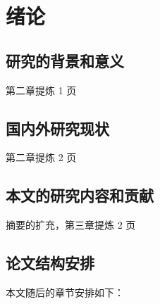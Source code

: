 \chapter{绪论}

\section{研究的背景和意义}

第二章提炼 1 页

\section{国内外研究现状}

第二章提炼 2 页

\section{本文的研究内容和贡献}

摘要的扩充，第三章提炼 2 页

\section{论文结构安排}

本文随后的章节安排如下：